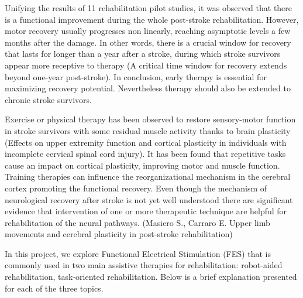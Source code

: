 Unifying the results of 11 rehabilitation pilot studies, it was observed that there is a functional improvement during the whole post-stroke rehabilitation. However, motor recovery usually progresses non linearly, reaching asymptotic levels a few months after the damage. In other words, there is a crucial window for recovery that lasts for longer than a year after a stroke, during which stroke survivors appear more receptive to therapy (A critical time window for recovery extends beyond one-year post-stroke). In conclusion, early therapy is essential for maximizing recovery potential. Nevertheless therapy should also be extended to chronic stroke survivors.

Exercise or physical therapy has been observed to restore sensory-motor function in stroke survivors with some residual muscle activity thanks to brain plasticity (Effects on upper extremity function and cortical plasticity in individuals with incomplete cervical spinal cord injury). It has been found that repetitive tasks cause an impact on cortical plasticity, improving motor and muscle function. Training therapies can influence the reorganizational mechanism in the cerebral cortex promoting the functional recovery. Even though the mechanism of neurological recovery after stroke is not yet well understood there are significant evidence that intervention of one or more therapeutic technique are helpful for rehabilitation of the neural pathways. (Masiero S., Carraro E. Upper limb movements and cerebral plasticity in post-stroke rehabilitation)

In this project, we explore Functional Electrical Stimulation (FES) that is commonly used in two main assistive therapies for rehabilitation: robot-aided rehabilitation, task-oriented rehabilitation. Below is a brief explanation presented for each of the three topics.

